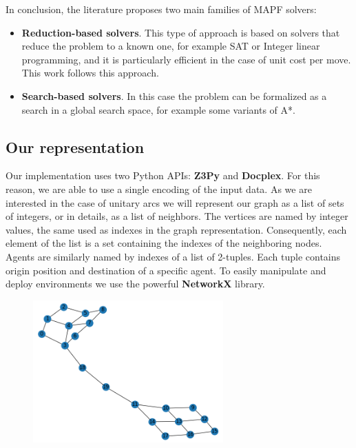 \documentclass[12pt, a4paper, hidelinks]{article}
\numberwithin{equation}{section}
\begin{document}
In conclusion, the literature proposes two main families of MAPF solvers:

\begin{itemize}
\item \textbf{Reduction-based solvers}.
This type of approach is based on solvers that reduce the problem to a known one, for example SAT or Integer linear programming, and it is particularly efficient in the case of unit cost per move.
This work follows this approach.
\item \textbf{Search-based solvers}.
In this case the problem can be formalized as a search in a global search space, for example some variants of A*.
\end{itemize}

\subsection*{Our representation}
Our implementation uses two Python APIs: \textbf{Z3Py} and \textbf{Docplex}.
For this reason, we are able to use a single encoding of the input data.
As we are interested in the case of unitary arcs we will represent our graph as a list of sets of integers, or in details, as a list of neighbors.
The vertices are named by integer values, the same used as indexes in the graph representation.
Consequently, each element of the list is a set containing the indexes of the neighboring nodes.
Agents are similarly named by indexes of a list of 2-tuples.
Each tuple contains origin position and destination of a specific agent.
To easily manipulate and deploy environments we use the powerful \textbf{NetworkX} library.

\begin{figure}
    \centering
    \includegraphics[width=0.65\textwidth]{environment.png}
\end{figure}
\end{document}
